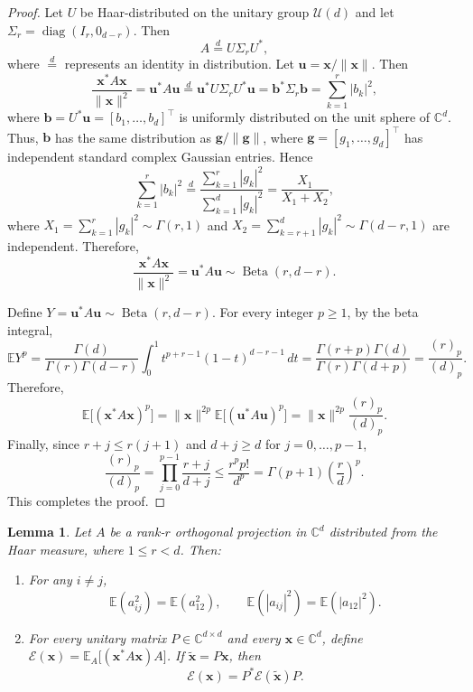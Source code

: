 \documentclass{article}
\newcommand{\C}{{\mathbb C}}
\newcommand{\E}{{\mathbb E}}
\newcommand{\vx}{{\mathbf x}}
\newcommand{\vb}{{\mathbf b}}
\newcommand{\vu}{{\mathbf u}}
\newcommand{\vg}{{\mathbf g}}
\newcommand{\0}{{\mathbf 0}}
\newtheorem{lemma}[theorem]{Lemma}
\numberwithin{equation}{section}
\begin{document}
	\begin{proof}
		Let $U$ be Haar-distributed on the unitary group $\mathcal U(d)$ and let $\Sigma_r=\operatorname{diag}(I_r,0_{d-r})$. Then
		\[
		A\stackrel{d}{=}U\Sigma_rU^*,
		\]
		where $\stackrel{d}{=}$ represents an identity in distribution. 
		Let $\vu=\vx/\|\vx\|$. Then
		\[
		\frac{\vx^*A\vx}{\|\vx\|^2}=\vu^*A\vu\stackrel{d}{=}\vu^*U\Sigma_rU^*\vu=\vb^*\Sigma_r\vb=\sum_{k=1}^r|b_k|^2,
		\]
		where $\vb=U^*\vu=[b_1,\ldots,b_d]^\top$ is uniformly distributed on the unit sphere of $\C^d$. Thus, $\vb$ has the same distribution as $\vg/\|\vg\|$, where $\vg=[g_1,\ldots,g_d]^\top$ has independent standard complex Gaussian entries. Hence
		\[
		\sum_{k=1}^r|b_k|^2\stackrel{d}{=}\frac{\sum_{k=1}^r|g_k|^2}{\sum_{k=1}^d|g_k|^2}=\frac{X_1}{X_1+X_2},
		\]
		where $X_1=\sum_{k=1}^r|g_k|^2\sim\Gamma(r,1)$ and $X_2=\sum_{k=r+1}^d|g_k|^2\sim\Gamma(d-r,1)$ are independent. Therefore,
		\[
		\frac{\vx^*A\vx}{\|\vx\|^2}=\vu^*A\vu\sim\operatorname{Beta}(r,d-r).
		\]
		
		Define $Y=\vu^*A\vu\sim\operatorname{Beta}(r,d-r)$. For every integer $p\ge1$, by the beta integral,
		\[
		\E Y^p=\frac{\Gamma(d)}{\Gamma(r)\Gamma(d-r)}\int_0^1t^{p+r-1}(1-t)^{d-r-1}\,dt=\frac{\Gamma(r+p)\Gamma(d)}{\Gamma(r)\Gamma(d+p)}=\frac{(r)_p}{(d)_p}.
		\]
		Therefore,
		\[
		\E\big[(\vx^*A\vx)^p\big]=\|\vx\|^{2p}\E\big[(\vu^*A\vu)^p\big]=\|\vx\|^{2p}\frac{(r)_p}{(d)_p}.
		\]
		Finally, since $r+j\le r(j+1)$ and $d+j\ge d$ for $j=0,\ldots,p-1$,
		\[
		\frac{(r)_p}{(d)_p}=\prod_{j=0}^{p-1}\frac{r+j}{d+j}\le\frac{r^pp!}{d^p}=\Gamma(p+1)\left(\frac{r}{d}\right)^p.
		\]
		This completes the proof.
	\end{proof}
	
	\begin{lemma}
		\label{lem:expectation1}
		Let $A$ be a rank-$r$ orthogonal projection in $\C^d$ distributed from the Haar measure, where $1\le r<d$. Then:
		\begin{enumerate}
			\item For any $i\ne j$,
			\[
			\E(a_{ij}^2)=\E(a_{12}^2),\qquad \E(|a_{ij}|^2)=\E(|a_{12}|^2).
			\]
			\item For every unitary matrix $P\in\C^{d\times d}$ and every $\vx\in\C^d$, define
			$
			\mathcal E(\vx)=\E_A\big[(\vx^*A\vx)A\big]$. 
			If $\widetilde{\vx}=P\vx$, then
			\[
			\mathcal E(\vx)=P^*\mathcal E(\widetilde{\vx})P.
			\]
		\end{enumerate}
	\end{lemma}
	
\end{document}
